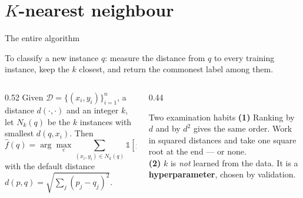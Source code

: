 \documentclass[aspectratio=169]{beamer}
\begin{document}
\section[$k$-NN]{$K$-nearest neighbour}
\label{sec:knn}

\begin{frame}[shrink=6]{The entire algorithm}
  \begin{exampleblock}{}
    \centering\small
    To classify a new instance $q$: measure the distance from $q$ to every
    training instance, keep the $k$ closest, and return the commonest label
    among them.
  \end{exampleblock}
  \vspace{0.2em}
  \begin{columns}[T]
    \begin{column}{0.52\textwidth}
      Given $\mathcal{D} = \{(x_i, y_i)\}_{i=1}^{n}$, a distance
      $d(\cdot,\cdot)$ and an integer $k$, let $N_k(q)$ be the $k$ instances
      with smallest $d(q, x_i)$. Then
      \[
        \hat{f}(q) = \arg\max_{c} \sum_{(x_i, y_i) \in N_k(q)}
        \mathbb{1}[y_i = c],
      \]
      with the default distance
      $d(p,q) = \sqrt{\sum_{j} (p_j - q_j)^2}$.
    \end{column}
    \begin{column}{0.44\textwidth}
      \begin{block}{Two examination habits}
        \small \textbf{(1)} Ranking by $d$ and by $d^2$ gives the same order.
        Work in squared distances and take one square root at the end --- or
        none.\\[0.3em]
        \textbf{(2)} $k$ is \emph{not} learned from the data. It is a
        \textbf{hyperparameter}, chosen by validation.
      \end{block}
    \end{column}
  \end{columns}
\end{frame}
\end{document}
